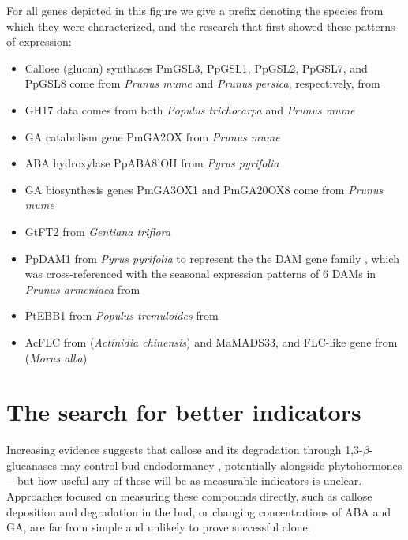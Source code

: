 \documentclass[11pt]{article}
\begin{document}
For all genes depicted in this figure we give a prefix denoting the species from which they were characterized, and the research that first showed these patterns of expression: 
\begin{itemize}
\item Callose (glucan) synthases PmGSL3, PpGSL1, PpGSL2, PpGSL7, and PpGSL8 come from \emph{Prunus mume} and\emph{ Prunus persica}, respectively, from \citet{zhang_genome-wide_2023}
\item GH17 data comes from both \emph{Populus trichocarpa} \citep{rinne2011} and \emph{Prunus mume} \citep{zhang_transcriptome_2018}
\item GA catabolism gene PmGA2OX from \emph{Prunus mume} \citep{zhang_transcriptome_2018}
\item ABA hydroxylase PpABA8'OH from \emph{Pyrus pyrifolia} \citep{tuan2017dormancy}
\item GA biosynthesis genes PmGA3OX1 and PmGA20OX8 come from \emph{Prunus mume} \citep{zhang_transcriptome_2018}
\item GtFT2 from \emph{Gentiana triflora} \citep{takahashi_gentian_2022}
\item PpDAM1 from \emph{Pyrus pyrifolia} to represent the the DAM gene family \citep{tuan2017dormancy}, which was cross-referenced with the seasonal expression patterns of 6 DAMs in \emph{Prunus armeniaca} from \citet{yu2020distinctive}
\item PtEBB1 from \emph{Populus tremuloides} from \citet{azeez2021early}
\item AcFLC from \citet{voogd_mads-box_2022} (\emph{Actinidia chinensis}) and MaMADS33, and FLC-like gene from \citet{luo_alternative_2024} (\emph{Morus alba})
\end{itemize}


\section*{The search for better indicators}

Increasing evidence suggests that callose and its degradation through 1,3-$\beta$-glucanases may control bud endodormancy \citep{rinne2011,vanderschoot2014,pan2023epigenetic,pandey2026variable}, potentially alongside phytohormones \citep[such as ABA and GA,][]{tylewicz2018photoperiodic,pan2021aba}---but how useful any of these will be as measurable indicators is unclear. Approaches focused on measuring these compounds directly, such as callose deposition and degradation in the bud, or changing concentrations of ABA and GA, are far from simple and unlikely to prove successful alone. %
\end{document}

